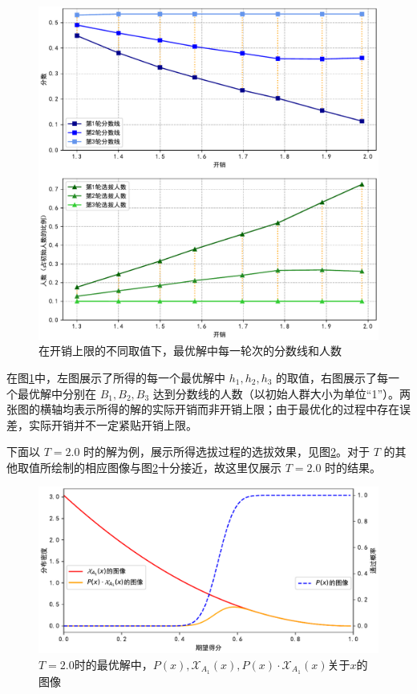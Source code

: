         \begin{figure}[htbp]
            \centering
            \includegraphics[width=\textwidth]{fig/plottingH1H2H3.pdf}
            \caption{在开销上限的不同取值下，最优解中每一轮次的分数线和人数}
            \label{fig:plottingH1H2H3}
        \end{figure}

        在图\ref{fig:plottingH1H2H3}中，左图展示了所得的每一个最优解中 $h_1,h_2,h_3$ 的取值，右图展示了每一个最优解中分别在 $B_1,B_2,B_3$ 达到分数线的人数（以初始人群大小为单位“1”）。两张图的横轴均表示所得的解的实际开销而非开销上限；由于最优化的过程中存在误差，实际开销并不一定紧贴开销上限。

        \vspace{1.5ex}

        下面以 $T=2.0$ 时的解为例，展示所得选拔过程的选拔效果，见图\ref{fig:plottingOptimizedDistri}。对于 $T$ 的其他取值所绘制的相应图像与图\ref{fig:plottingOptimizedDistri}十分接近，故这里仅展示 $T=2.0$ 时的结果。

        \begin{figure}[htbp]
            \centering
            \includegraphics[width=\textwidth]{fig/plottingDistriInOptimizedArrangement.pdf}
            \caption{$T=2.0$时的最优解中，$P(x),\mathcal{X}_{A_1}(x),P(x)\cdot\mathcal{X}_{A_1}(x)$关于$x$的图像}
            \label{fig:plottingOptimizedDistri}
        \end{figure}

